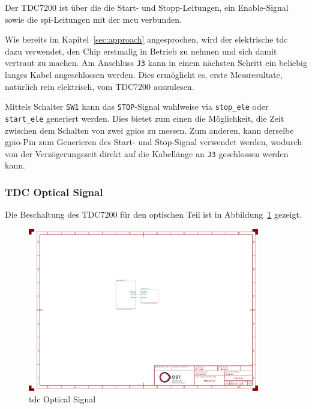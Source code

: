 Der TDC7200 ist über die die Start- und Stopp-Leitungen, ein Enable-Signal sowie die \acrshort{spi}-Leitungen mit der
\acrshort{mcu} verbunden.

Wie bereits im Kapitel~\ref{sec:approach} angesprochen, wird der elektrische \acrshort{tdc} dazu verwendet, den Chip
erstmalig in Betrieb zu nehmen und sich damit vertraut zu machen. Am Anschluss \lstinline|J3| kann in einem nächsten
Schritt ein beliebig langes Kabel angeschlossen werden. Dies ermöglicht es, erste Messresultate, natürlich rein elektrisch,
vom TDC7200 auszulesen.

Mittels Schalter \lstinline|SW1| kann das \lstinline|STOP|-Signal wahlweise via \lstinline|stop_ele| oder
\lstinline|start_ele| generiert werden. Dies bietet zum einen die Möglichkeit, die Zeit zwischen dem Schalten von zwei
\acrshort{gpio}s zu messen. Zum anderen, kann derselbe \acrshort{gpio}-Pin zum Generieren des Start- und Stop-Signal
verwendet werden, wodurch von der Verzögerungszeit direkt auf die Kabellänge an \lstinline|J3| geschlossen werden kann.

\subsubsection{TDC Optical Signal}

Die Beschaltung des TDC7200 \cite{ti2016tdc7200_datasheet} für den optischen Teil ist in
Abbildung~\ref{fig:tdc_opt_signal} gezeigt.

\begin{figure}[H]
    \centering
    \includegraphics[page=2, trim=530 330 300 310, clip, width=0.9\textwidth]{attachments/schematic.pdf}
    \caption{\acrshort{tdc} Optical Signal}\label{fig:tdc_opt_signal}
\end{figure}

